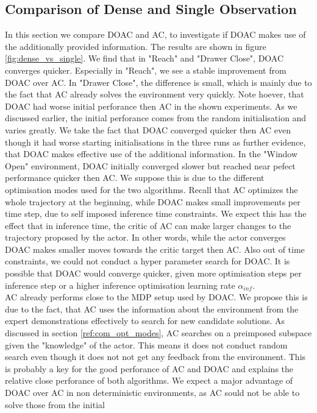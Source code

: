 \subsection{Comparison of Dense and Single Observation}
In this section we compare DOAC and AC, to investigate if DOAC makes use of the additionally provided information. The results are shown in figure \ref{fig:dense_vs_single}.
We find that in "Reach" and "Drawer Close", DOAC converges quicker. Especially in "Reach", we see a stable improvement from DOAC over AC. In "Drawer Close", the difference is 
small, which is mainly due to the fact that AC already solves the environment very quickly. Note hoever, that DOAC had worse initial perforance then AC in the shown experiments. 
As we discussed earlier, the initial perforance comes from the random initialisation and varies greatly. We take the fact that DOAC converged quicker then AC even though it had 
worse starting initialisations in the three runs as further evidence, that DOAC makes effective use of the additional information. In the "Window Open" environment, DOAC initially converged slower but 
reached near pefect performance quicker then AC. We suppose this is due to the different optimisation modes used for the two algorithms. Recall that AC optimizes the whole 
trajectory at the beginning, while DOAC makes small improvements per time step, due to self imposed inference time constraints. We expect this has the effect that in inference time, the critic of 
AC can make larger changes to the trajectory proposed by the actor. In other words, while the actor converges DOAC makes smaller moves towards the critic target then AC. Also out of time constraints, we could 
not conduct a hyper parameter search for DOAC. It is possible that DOAC would converge quicker, given more optimisation steps per inference step or a higher inference optimisation 
learning rate $\alpha_{inf}$.\\ 
AC already performs close to the MDP setup used by DOAC. We propose this is due to the fact, that AC uses the information about the environment 
from the expert demonstrations effectively to search for new candidate solutions. As discussed in section \ref{ref:com_opt_modes}, AC searches on a preimposed subspace given the "knowledge" of the 
actor. This means it does not conduct random search even though it does not not get any feedback from the environment. This is probably a key for the good perforance of AC and DOAC and explains 
the relative close perforance of both algorithms. We expect a major advantage of DOAC over AC in non deterministic environments, as AC sould not be able to solve those from the initial 
